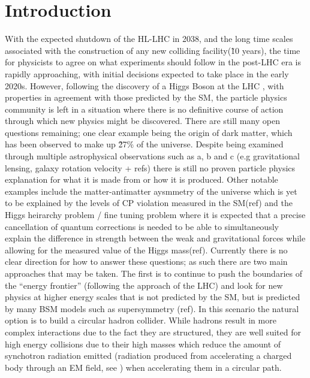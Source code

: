 \chapter{Introduction}

With the expected shutdown of the \ac{HL-LHC} in 2038, and the long time scales associated with the construction of any new colliding facility(\~10 years), the time for physicists to agree on what experiments should follow in the post-\ac{LHC} era is rapidly approaching, with initial decisions expected to take place in the early 2020s. However, following the discovery of a Higgs Boson at the \ac{LHC} \cite{:2012gk,Chatrchyan:2012xdj}, with properties in agreement with those predicted by the \ac{SM}, the particle physics community is left in a situation where there is no definitive course of action through which new physics might be discovered. There are still many open questions remaining; one clear example being the origin of dark matter, which has been observed to make up \~27\% of the universe. Despite being examined through multiple astrophysical observations such as a, b and c (e.g gravitational lensing, galaxy rotation velocity + refs) there is still no proven particle physics explanation for what it is made from or how it is produced. Other notable examples include the matter-antimatter aysmmetry of the universe which is yet to be explained by the levels of CP violation measured in the \ac{SM}(ref) and the Higgs heirarchy problem / fine tuning problem where it is expected that a precise cancellation of quantum corrections is needed to be able to simultaneously explain the difference in strength between the weak and gravitational forces while allowing for the measured value of the Higgs mass(ref). Currently there is no clear direction for how to answer these questions; as such there are two main approaches that may be taken. The first is to continue to push the boundaries of the ``energy frontier'' (following the approach of the \ac{LHC}) and look for new physics at higher energy scales that is not predicted by the \ac{SM}, but is predicted by many \ac{BSM} models such as supersymmetry (ref). In this scenario the natural option is to build a circular hadron collider. While hadrons result in more complex interactions due to the fact they are structured, they are well suited for high energy collisions due to their high masses which reduce the amount of synchotron radiation emitted (radiation produced from accelerating a charged body through an \ac{EM} field, see ) when accelerating them in a circular path.

